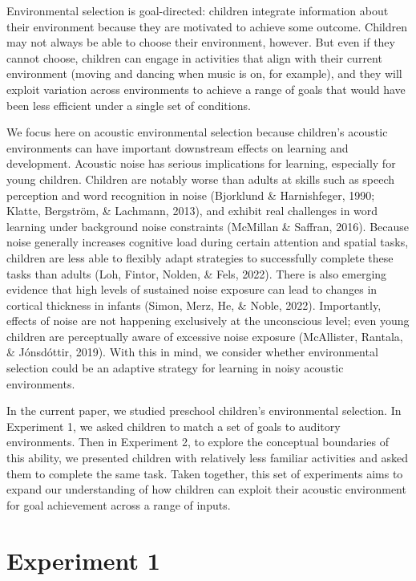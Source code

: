 \documentclass[10pt, letterpaper]{article}
\begin{document}
Environmental selection is goal-directed: children integrate information
about their environment because they are motivated to achieve some
outcome. Children may not always be able to choose their environment,
however. But even if they cannot choose, children can engage in
activities that align with their current environment (moving and dancing
when music is on, for example), and they will exploit variation across
environments to achieve a range of goals that would have been less
efficient under a single set of conditions.

We focus here on acoustic environmental selection because children's
acoustic environments can have important downstream effects on learning
and development. Acoustic noise has serious implications for learning,
especially for young children. Children are notably worse than adults at
skills such as speech perception and word recognition in noise
(Bjorklund \& Harnishfeger, 1990; Klatte, Bergström, \& Lachmann, 2013),
and exhibit real challenges in word learning under background noise
constraints (McMillan \& Saffran, 2016). Because noise generally
increases cognitive load during certain attention and spatial tasks,
children are less able to flexibly adapt strategies to successfully
complete these tasks than adults (Loh, Fintor, Nolden, \& Fels, 2022).
There is also emerging evidence that high levels of sustained noise
exposure can lead to changes in cortical thickness in infants (Simon,
Merz, He, \& Noble, 2022). Importantly, effects of noise are not
happening exclusively at the unconscious level; even young children are
perceptually aware of excessive noise exposure (McAllister, Rantala, \&
Jónsdóttir, 2019). With this in mind, we consider whether environmental
selection could be an adaptive strategy for learning in noisy acoustic
environments.

In the current paper, we studied preschool children's environmental
selection. In Experiment 1, we asked children to match a set of goals to
auditory environments. Then in Experiment 2, to explore the conceptual
boundaries of this ability, we presented children with relatively less
familiar activities and asked them to complete the same task. Taken
together, this set of experiments aims to expand our understanding of
how children can exploit their acoustic environment for goal achievement
across a range of inputs.

\hypertarget{experiment-1}{%
\section{Experiment 1}\label{experiment-1}}
\end{document}
